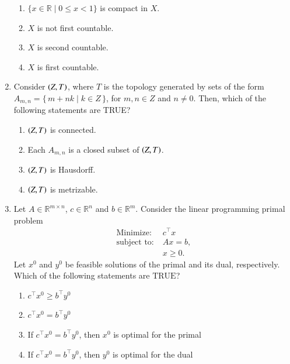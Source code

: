 \documentclass[journal,12pt,onecolumn]{IEEEtran}
\theoremstyle{remark}
\begin{document}
\begin{enumerate}
\hfill{}

\begin{enumerate}
\item $\{x\in\mathbb{R}\mid 0\le x<1\}$ is compact in $X$.
\item $X$ is not first countable.
\item $X$ is second countable.
\item $X$ is first countable.
\end{enumerate}

\item Consider $\left(Z, T\right)$, where $T$ is the topology generated by sets of the form \newline $A_{m,n} = \{\, m + n k \mid k \in Z \,\}$, for $m,n \in Z$ and $n \neq 0$. Then, which of the following statements are TRUE?

\hfill{}

\begin{enumerate}
\item $\left(Z, T\right)$ is connected.
\item Each $A_{m,n}$ is a closed subset of $\left(Z, T\right)$.
\item $\left(Z, T\right)$ is Hausdorff.
\item $\left(Z, T\right)$ is metrizable.
\end{enumerate}

\item Let $A \in \mathbb{R}^{m \times n}$, $c \in \mathbb{R}^{n}$ and $b \in \mathbb{R}^{m}$. Consider the linear programming primal problem
\begin{align*}
\text{Minimize}\colon\; & c^{\top}x \\
\text{subject to}\colon\; & Ax = b,\\
& x \ge 0.
\end{align*}
Let $x^{0}$ and $y^{0}$ be feasible solutions of the primal and its dual, respectively. Which of the following statements are $\text{TRUE}$?

\hfill{}

\begin{enumerate}
\item $c^{\top}x^{0} \ge b^{\top}y^{0}$
\item $c^{\top}x^{0}= b^{\top}y^{0}$
\item If $c^{\top}x^{0} = b^{\top}y^{0}$, then $x^{0}$ is optimal for the primal
\item If $c^{\top}x^{0} = b^{\top}y^{0}$, then $y^{0}$ is optimal for the dual
\end{enumerate}


\end{enumerate}
\end{document}
